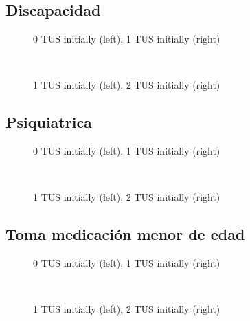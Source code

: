\documentclass[12pt]{article}
\begin{document}
\subsection{Discapacidad}
\begin{figure}[H]%
	\centering
	\caption*{0 TUS initially (left), 1 TUS initially (right)}
	 \quad 
	 \\
	
	\caption*{1 TUS initially (left), 2 TUS initially (right)}
	 \qquad
	\label{fig:discapacidadSiTwo}%
\end{figure}


\subsection{Psiquiatrica}
\begin{figure}[H]%
	\centering
	\caption*{0 TUS initially (left), 1 TUS initially (right)}
	 \quad 
	 \\
	
	\caption*{1 TUS initially (left), 2 TUS initially (right)}
	 \qquad
	\label{fig:psiquiatricaSiTwo}%
\end{figure}


\subsection{Toma medicación menor de edad}
\begin{figure}[H]%
	\centering
	\caption*{0 TUS initially (left), 1 TUS initially (right)}
	 \quad 
	 \\
	
	\caption*{1 TUS initially (left), 2 TUS initially (right)}
	 \qquad
	\label{fig:tomamedicacion18Two}%
\end{figure}
\end{document}
